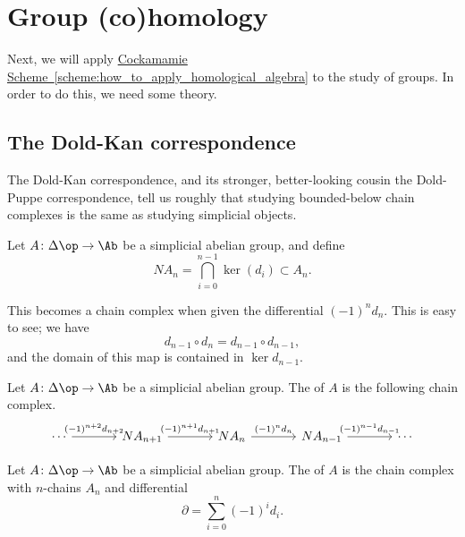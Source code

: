 \documentclass[main.tex]{subfiles}
\begin{document}
\section{Group (co)homology}
\label{sec:group_co_homology}

Next, we will apply \hyperref[scheme:how_to_apply_homological_algebra]{Cockamamie Scheme~\ref*{scheme:how_to_apply_homological_algebra}} to the study of groups. In order to do this, we need some theory.

\subsection{The Dold-Kan correspondence}
\label{ssc:the_dold_kan_correspondence}

The Dold-Kan correspondence, and its stronger, better-looking cousin the Dold-Puppe correspondence, tell us roughly that studying bounded-below chain complexes is the same as studying simplicial objects.

Let $A\colon \Delta\op \to \Ab$ be a simplicial abelian group, and define
\begin{equation*}
  NA_{n} = \bigcap_{i = 0}^{n-1} \ker(d_{i}) \subset A_{n}.
\end{equation*}

This becomes a chain complex when given the differential $(-1)^{n}d_{n}$. This is easy to see; we have
\begin{equation*}
  d_{n-1} \circ d_{n} = d_{n-1} \circ d_{n-1},
\end{equation*}
and the domain of this map is contained in $\ker d_{n-1}$.

\begin{definition}
  \label{def:normalized_chain_complex}
  Let $A\colon \Delta\op \to \Ab$ be a simplicial abelian group. The  of $A$ is the following chain complex.
  \begin{equation*}
    \begin{tikzcd}[column sep=large]
      \cdots
      \arrow[r, "(-1)^{n+2}d_{n+2}"]
      & N A_{n+1}
      \arrow[r, "(-1)^{n+1}d_{n+1}"]
      & N A_{n}
      \arrow[r, "(-1)^{n}d_{n}"]
      & N A_{n-1}
      \arrow[r, "(-1)^{n-1}d_{n-1}"]
      & \cdots
    \end{tikzcd}
  \end{equation*}
\end{definition}

\begin{definition}
  \label{def:moore_complex}
  Let $A\colon \Delta\op \to \Ab$ be a simplicial abelian group. The  of $A$ is the chain complex with $n$-chains $A_{n}$ and differential
  \begin{equation*}
    \partial = \sum_{i = 0}^{n} (-1)^{i} d_{i}.
  \end{equation*}
\end{definition}
\end{document}

